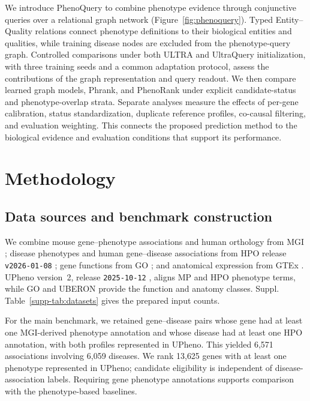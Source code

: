 \documentclass[webpdf,contemporary,large]{oup-authoring-template}%
\newif\ifshowfigures
\theoremstyle{thmstyleone}%
\theoremstyle{thmstyletwo}%
\theoremstyle{thmstylethree}%
\renewcommand{\cite}{\citep}
\begin{document}
We introduce PhenoQuery to combine phenotype evidence through conjunctive
queries over a relational graph network (Figure~\ref{fig:phenoquery}). Typed Entity--Quality relations connect
phenotype definitions to their biological entities and qualities, while
training disease nodes are excluded from the phenotype-query graph. Controlled
comparisons under both ULTRA and UltraQuery initialization, with three training
seeds and a common adaptation protocol, assess the contributions of the graph
representation and query readout. We then compare
learned graph models, Phrank, and PhenoRank under explicit candidate-status and
phenotype-overlap strata. Separate analyses measure the effects of per-gene
calibration, status standardization, duplicate reference profiles, co-causal
filtering, and evaluation weighting. This connects the proposed prediction
method to the biological evidence and evaluation conditions that support its
performance.

\ifshowfigures

\fi

\section{Methodology}

\subsection{Data sources and benchmark construction}
\label{sec:datasets}

We combine mouse gene--phenotype associations and human orthology from
MGI \cite{baldarelli2024mouse}; disease phenotypes and human gene--disease
associations from HPO release \texttt{v2026-01-08}
\cite{gargano2024human}; gene functions from GO
\cite{ashburner2000go,gocon2025}; and anatomical expression from GTEx
\cite{gtex2020}. UPheno version~2, release \texttt{2025-10-12}
\cite{matentzoglu2024unified}, aligns MP and HPO phenotype terms, while
GO and UBERON \cite{mungall2012uberon} provide the function and anatomy
classes. Suppl. Table~\ref{supp-tab:datasets} gives the prepared input counts.

For the main benchmark, we retained gene--disease pairs whose gene
had at least one MGI-derived phenotype annotation and whose disease
had at least one HPO annotation, with both profiles represented in
UPheno. This yielded 6{,}571 associations involving 6{,}059 diseases.
We rank 13{,}625 genes with at least one phenotype represented in UPheno;
candidate eligibility is independent of disease-association labels.
Requiring gene phenotype annotations supports comparison with the
phenotype-based baselines.
\end{document}
